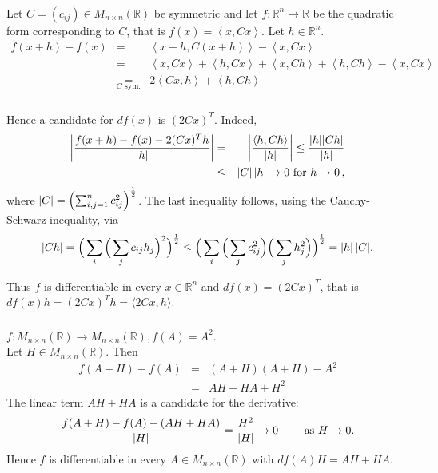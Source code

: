  \begin{frame}[fragile] \frametitle{}
 Let $C = (c_{ij}) \in M_{n\times n}(\mathbb{R})$ be symmetric and let
    $f\colon \mathbb{R}^n \rightarrow \mathbb{R}$ be the quadratic form 
    corresponding to $C$, that is $f(x) = \left<x, Cx \right>$.
    Let
    $h \in \mathbb{R}^n$.
    \begin{eqnarray*}
      f(x+h) - f(x) &=& \left< x+h, C(x+h) \right> - \left<x, Cx \right>\\
    & = & \left<x, Cx\right> + \left<h, Cx \right> + \left<x, Ch \right>
    + \left< h, Ch \right> - \left<x, Cx \right>\\
    & \underset{C \text{ sym.}}{=} & 2 \left<Cx, h \right> + \left<h, Ch \right>
  \end{eqnarray*}

\end{frame}


 \begin{frame}[fragile] \frametitle{}

  Hence a candidate for $df(x)$ is 
   $(2 Cx)^T$. Indeed,
  \begin{eqnarray*}
    \left| {f(x+h) - f(x) - 2(Cx)^T h \over |h| } \right|
    & = & \left| { \left<h, Ch \right> \over |h| } \right|
    \leq  {|h| |Ch| \over |h|}\\
    &\le&
    |C| \, |h| 
    \rightarrow 0 \text{ for } h \rightarrow 0\,,
  \end{eqnarray*}
  where $ |C|= \left(\sum_{i,j=1}^n c_{ij}^2\right)^{1 \over 2}$.
  The last inequality follows, using the Cauchy-Schwarz inequality, via
  \[|Ch| = \Big(\sum_i \Big(\sum_j  c_{ij} h_j\Big)^2\Big)^{1 \over 2}
      \leq
      \Big(\sum_i \Big(\sum_j  c_{ij}^2\Big)
        \Big(\sum_j h_j^2\Big)\Big)^{1 \over 2}
      = |h| \, |C|.\]


Thus $f$ is differentiable in every 
  $x \in \mathbb{R}^n$ 
    and $d f(x) = (2Cx)^T$, that is $df(x)h = (2Cx)^Th= \langle 2Cx,h\rangle$.
    
\end{frame}


 \begin{frame}[fragile] \frametitle{}



 $f\colon M_{n\times n}(\mathbb{R}) \rightarrow M_{n \times n}(\mathbb{R}), f(A) = A^2$.\\
    Let $H \in M_{n\times n}(\mathbb{R})$. Then
    \begin{eqnarray*}
      f(A + H) - f(A) & = & (A+H)(A+H) - A^2\\
      & = & AH + HA + H^2
    \end{eqnarray*}
    The linear term
    $ AH +HA$ is a candidate for the derivative:
      \[{f(A+H) - f(A) - (AH + HA) \over |H|}
       =  {H^2 \over |H|}
       \rightarrow  0 \qquad \text{ as } H \to 0.
    \]Hence $f$ is differentiable in every $A \in  M_{n \times n}(\mathbb{R})$ with $df(A)H = AH + HA$.


\end{frame}


